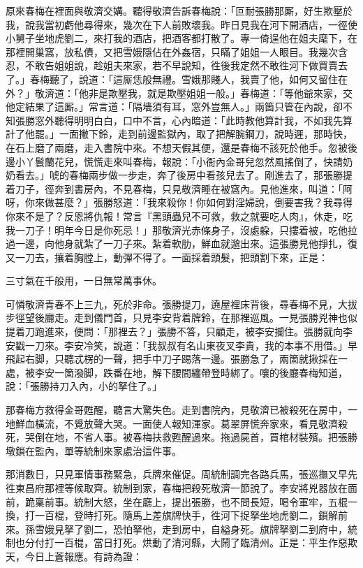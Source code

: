 原來春梅在裡面與敬濟交媾。聽得敬濟告訴春梅說：「叵耐張勝那厮，好生欺壓於我，說我當初虧他尋得來，幾次在下人前敗壞我。昨日見我在河下開酒店，一徑使小舅子坐地虎劉二，來打我的酒店，把酒客都打散了。專一倚逞他在姐夫麾下，在那裡開巢窩，放私債，又把雪娥隱佔在外姦宿，只瞞了姐姐一人眼目。我幾次含忍，不敢告姐姐說，趁姐夫來家，若不早說知，徃後我定然不敢徃河下做買賣去了。」春梅聽了，說道：「這厮恁般無禮。雪娥那賤人，我賣了他，如何又留住在外？」敬濟道：「他非是欺壓我，就是欺壓姐姐一般。」春梅道：「等他爺來家，交他定結果了這厮。」{}常言道：「隔墻須有耳，窓外豈無人。」兩箇只管在內說，卻不知張勝窓外聽得明明白白，口中不言，心內暗道：「此時教他算計我，不如我先算計了他罷。」{}一面撇下鈴，走到前邊監獄內，取了把解腕鋼刀，說時遲，那時快，在石上磨了兩磨，走入書院中來。不想天假其便，還是春梅不該死於他手。忽被後邊小丫鬟蘭花兒，慌慌走來叫春梅，報說：「小衙內金哥兒忽然風搖倒了，快請奶奶看去。」唬的春梅兩步做一步走，奔了後房中看孩兒去了。剛進去了，那張勝提着刀子，徑奔到書房內，不見春梅，只見敬濟睡在被窩內。見他進來，叫道：「阿呀，你來做甚麼？」張勝怒道：「我來殺你！{}你如何對淫婦說，倒要害我？我尋得你來不是了？反恩將仇報！常言『黑頭蟲兒不可救，救之就要吃人肉』，休走，吃我一刀子！明年今日是你死忌！」{}那敬濟光赤條身子，沒處躱，只摟着被，吃他拉過一邊，向他身就紮了一刀子來。紮着軟肋，鮮血就邈出來。這張勝見他掙扎，復又一刀去，攘着胸膛上，動彈不得了。一面採着頭髮，把頭割下來，{}正是：

\begin{myquote}
三寸氣在千般用，一日無常萬事休。
\end{myquote}

可憐敬濟青春不上三九，死於非命。張勝提刀，遶屋裡床背後，尋春梅不見，大拔步徑望後廳走。走到儀門首，只見李安背着牌鈴，在那裡巡風。一見張勝兇神也似提着刀跑進來，便問：「那裡去？」張勝不答，只顧走，被李安攔住。張勝就向李安戳一刀來。李安冷笑，說道：「我叔叔有名山東夜叉李貴，我的本事不用借。」早飛起右脚，只聽忒楞的一聲，把手中刀子踢落一邊。{}張勝急了，兩箇就揪採在一處，被李安一箇潑脚，跌番在地，解下腰間纏帶登時綁了。嚷的後廳春梅知道，說：「張勝持刀入內，小的拏住了。」

那春梅方救得金哥甦醒，聽言大驚失色。走到書院內，見敬濟已被殺死在房中，一地鮮血橫流，不覺放聲大哭。一面使人報知渾家。葛翠屏慌奔家來，看見敬濟殺死，哭倒在地，不省人事。被春梅扶救甦醒過來。拖過屍首，買棺材裝殯。把張勝墩鎖在監內，單等統制來家處治這件事。

那消數日，只見軍情事務緊急，兵牌來催促。周統制調完各路兵馬，張巡撫又早先徃東昌府那裡等候取齊。統制到家，春梅把殺死敬濟一節說了。李安將兇器放在面前，跪稟前事。統制大怒，坐在廳上，提出張勝，也不問長短，喝令軍牢，五棍一換，打一百棍，登時打死。隨馬上差旗牌快手，徃河下捉拏坐地虎劉二，鎖解前來。孫雪娥見拏了劉二，恐怕拏他，走到房中，自縊身死。旗牌拏劉二到府中，統制也分付打一百棍，當日打死。{}烘動了清河縣，大鬧了臨清州。正是：平生作惡欺天，今日上蒼報應。有詩為證：

